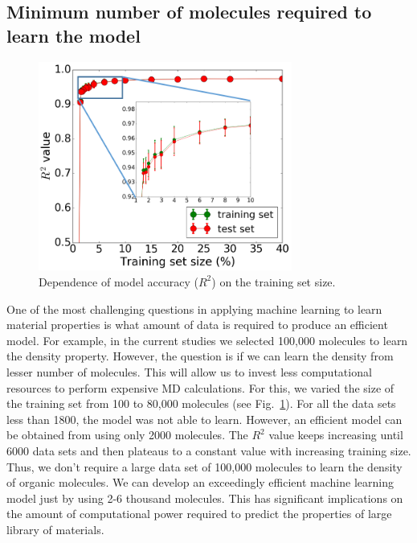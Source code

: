 \subsection{Minimum number of molecules required to learn the model}
\label{subsec:number_of_molecules}

\begin{figure}[htbp] 
	\centering
	\includegraphics[width=0.744\textwidth]{Chapter-6/Figures/Learning_curve_new.png}
	\caption{Dependence of model accuracy ($R^{2}$) on the training set size.} 
	\label{fig:Learning_curve} 
\end{figure}  

One of the most challenging questions in applying machine learning to learn material properties is what amount of data is required to produce an efficient model. For example, in the current studies we selected 100,000 molecules to learn the density property. However, the question is if we can learn the density from lesser number of molecules. This will allow us to invest less computational resources to perform expensive MD calculations. For this, we varied the size of the training set from 100 to 80,000 molecules (see Fig.\ \ref{fig:Learning_curve}). For all the data sets less than 1800, the model was not able to learn. However, an efficient model can be obtained from using only 2000 molecules. The $R^2$ value keeps increasing until 6000 data sets and then plateaus to a constant value with increasing training size. Thus, we don’t require a large data set of 100,000 molecules to learn the density of organic molecules. We can develop an exceedingly efficient machine learning model just by using 2-6 thousand molecules. This has significant implications on the amount of computational power required to predict the properties of large library of materials. 


